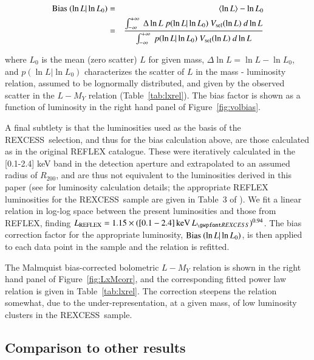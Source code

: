 \documentclass[oldversion]{aa}
\newcommand{\rexcess}{{\gwpfont REXCESS}}
\begin{document}
\begin{eqnarray*}
{\rm Bias}\ (\ln{L} |\ln{L_{0}}) & = & \langle \ln{L} \rangle  - \ln{L_{0}} \\
 & =  & {\int^{+\infty}_{-\infty}~ 
\Delta \ln{L}~  p(\ln{L} | \ln{L_{0}})~ V_{\rm sel}(\ln{L})~ d \ln{L}
\over \int^{+\infty}_{-\infty}~  p(\ln{L} | \ln{L_{0}})~ V_{\rm sel} (\ln{L})~ d \ln{L} }       
\end{eqnarray*}

\noindent where $L_{0}$ is the mean (zero scatter) $L$ for given mass, $\Delta \ln{L} = \ln{L} - \ln{L_{0}}$,
and $p(\ln{L} | \ln{L_{0}})$ characterizes the scatter of $L$ in the mass - luminosity relation, assumed to be lognormally distributed, and given by the observed scatter in the $L-M_Y$ relation (Table~\ref{tab:lxrel}). The bias factor is shown as a function of luminosity in the right hand panel of Figure~\ref{fig:volbias}. 

A final subtlety is that the luminosities used as the basis of the \rexcess\ selection, and thus for the bias calculation above, are those calculated as in the original REFLEX catalogue. These were iteratively calculated in the [0.1-2.4] keV band in the detection aperture and extrapolated to an assumed radius of $R_{200}$, and are thus not equivalent to the luminosities derived in this paper (see \citealt{reflex} for luminosity calculation details; the appropriate REFLEX luminosities for the \rexcess\ sample are given in Table~3 of \citealt{boehringer07}). 
We fit a linear relation in log-log space between the present luminosities and those from REFLEX, finding $L_{\rm REFLEX} = 1.15 \times  ([0.1-2.4]\, {\rm keV}\, L_{\rexcess})^{0.94}$.
The bias correction factor for the appropriate luminosity, ${\rm Bias}\ (\ln{L} | \ln{L_{0}})$, is then applied to each data point in the sample and the relation is refitted.

The Malmquist bias-corrected bolometric $L-M_Y$ relation is shown in the right hand panel of Figure~\ref{fig:LxMcorr}, and the corresponding fitted power law relation is given in Table~\ref{tab:lxrel}. The correction steepens the relation somewhat, due to the under-representation, at a given mass, of low luminosity clusters in the \rexcess\ sample. 

\subsection{Comparison to other results}
\end{document}
